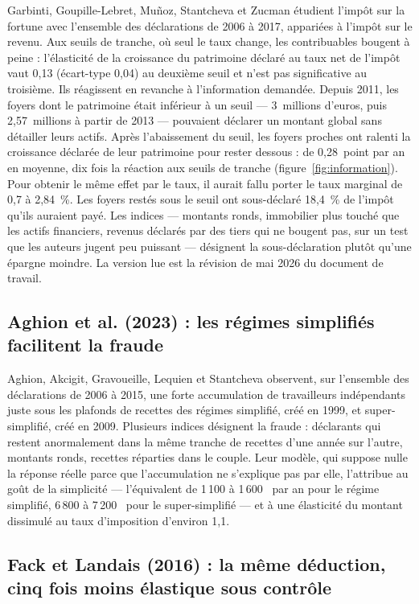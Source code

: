 \documentclass[11pt,a4paper]{article}
\providecommand{\euro}{\texteuro}
\begin{document}
Garbinti, Goupille-Lebret, Muñoz, Stantcheva et Zucman étudient l'impôt sur la fortune avec
l'ensemble des déclarations de 2006 à 2017, appariées à l'impôt sur le revenu. Aux seuils de tranche,
où seul le taux change, les contribuables bougent à peine : l'élasticité de la croissance du
patrimoine déclaré au taux net de l'impôt vaut 0,13 (écart-type 0,04) au deuxième seuil et n'est pas
significative au troisième. Ils réagissent en revanche à l'information demandée. Depuis 2011, les
foyers dont le patrimoine était inférieur à un seuil --- 3~millions d'euros, puis 2,57~millions à
partir de 2013 --- pouvaient déclarer un montant global sans détailler leurs actifs. Après
l'abaissement du seuil, les foyers proches ont ralenti la croissance déclarée de leur patrimoine pour
rester dessous : de 0,28~point par an en moyenne, dix fois la réaction aux seuils de tranche
(figure~\ref{fig:information}). Pour
obtenir le même effet par le taux, il aurait fallu porter le taux marginal de 0,7 à 2,84~\%. Les
foyers restés sous le seuil ont sous-déclaré 18,4~\% de l'impôt qu'ils auraient payé. Les indices
--- montants ronds, immobilier plus touché que les actifs financiers, revenus déclarés par des tiers
qui ne bougent pas, sur un test que les auteurs jugent peu puissant --- désignent la sous-déclaration
plutôt qu'une épargne moindre. La version lue est la révision de mai 2026 du document de travail.

\subsection{Aghion et al. (2023) : les régimes simplifiés facilitent la fraude}

Aghion, Akcigit, Gravoueille, Lequien et Stantcheva observent, sur l'ensemble des déclarations de
2006 à 2015, une forte accumulation de travailleurs indépendants juste sous les plafonds de recettes
des régimes simplifié, créé en 1999, et super-simplifié, créé en 2009. Plusieurs indices désignent la
fraude : déclarants qui restent anormalement dans la même tranche de recettes d'une année sur l'autre,
montants ronds, recettes réparties dans le couple. Leur modèle, qui suppose nulle la réponse réelle
parce que l'accumulation ne s'explique pas par elle, l'attribue au goût de la simplicité ---
l'équivalent de 1\,100 à 1\,600~\euro{} par an pour le régime simplifié, 6\,800 à 7\,200~\euro{} pour
le super-simplifié --- et à une élasticité du montant dissimulé au taux d'imposition d'environ 1,1.

\subsection{Fack et Landais (2016) : la même déduction, cinq fois moins élastique sous contrôle}
\end{document}
